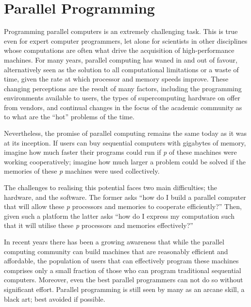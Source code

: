 \section{Parallel Programming}

Programming parallel computers is an extremely challenging task. This is true
even for expert computer programmers, let alone for scientists in other
disciplines whose computations are often what drive the acquisition of
high-performance machines. For many years, parallel computing has waned in and
out of favour, alternatively seen as the solution to all computational
limitations or a waste of time, given the rate at which processor and memory
speeds improve. These changing perceptions are the result of many factors,
including the programming environments available to users, the types of
supercomputing hardware on offer from vendors, and continual changes in the
focus of the academic community as to what are the ``hot'' problems of the time.

Nevertheless, the promise of parallel computing remains the same today as it was
at its inception. If users can buy sequential computers with gigabytes of
memory, imagine how much faster their programs could run if \emph{p} of these
machines were working cooperatively; imagine how much larger a problem could be
solved if the memories of these \emph{p} machines were used collectively.

The challenges to realising this potential faces two main difficulties; the
hardware, and the software. The former asks ``how do I build a parallel computer
that will allow these \emph{p} processors and memories to cooperate
efficiently?'' Then, given such a platform the latter asks ``how do I express my
computation such that it will utilise these \emph{p} processors and memories
effectively?''

In recent years there has been a growing awareness that while the parallel
computing community can build machines that are reasonably efficient and
affordable, the population of users that can effectively program these machines
comprises only a small fraction of those who can program traditional sequential
computers. Moreover, even the best parallel programmers can not do so without
significant effort. Parallel programming is still seen by many as an arcane
skill, a black art; best avoided if possible.

